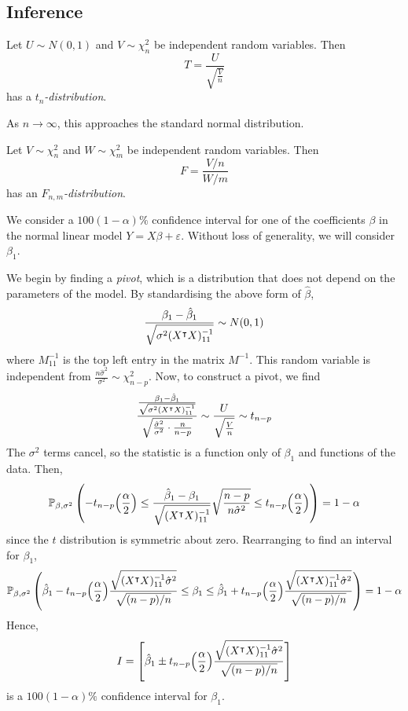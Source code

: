 \subsection{Inference}
\begin{definition}
	Let \( U \sim N(0,1) \) and \( V \sim \chi^2_n \) be independent random variables.
	Then
	\[
		T = \frac{U}{\sqrt{\frac{V}{n}}}
	\]
	has a \textit{\( t_n \)-distribution}.
\end{definition}
As \( n \to \infty \), this approaches the standard normal distribution.
\begin{definition}
	Let \( V \sim \chi^2_n \) and \( W \sim \chi^2_m \) be independent random variables.
	Then
	\[
		F = \frac{V/n}{W/m}
	\]
	has an \textit{\( F_{n,m} \)-distribution}.
\end{definition}
\begin{example}
	We consider a \( 100(1-\alpha)\% \) confidence interval for one of the coefficients \( \beta \) in the normal linear model \( Y = X\beta + \varepsilon \).
	Without loss of generality, we will consider \( \beta_1 \).

	We begin by finding a \textit{pivot}, which is a distribution that does not depend on the parameters of the model.
	By standardising the above form of \( \hat \beta \),
	\[
		\frac{\beta_1 - \hat \beta_1}{\sqrt{\sigma^2(X^\intercal X)^{-1}_{11}}} \sim N(0,1)
	\]
	where \( M^{-1}_{11} \) is the top left entry in the matrix \( M^{-1} \).
	This random variable is independent from \( \frac{n\hat \sigma^2}{\sigma^2} \sim \chi^2_{n-p} \).
	Now, to construct a pivot, we find
	\[
		\frac{\frac{\beta_1 - \hat \beta_1}{\sqrt{\sigma^2(X^\intercal X)^{-1}_{11}}}}{\sqrt{\frac{\hat \sigma^2}{\sigma^2} \cdot \frac{n}{n-p}}} \sim \frac{U}{\sqrt{\frac{V}{n}}} \sim t_{n-p}
	\]
	The \( \sigma^2 \) terms cancel, so the statistic is a function only of \( \beta_1 \) and functions of the data.
	Then,
	\[
		\mathbb{P}_{\beta,\sigma^2}\left({ -t_{n-p}\qty(\frac{\alpha}{2}) \leq \frac{\hat \beta_1 - \beta_1}{\sqrt{(X^\intercal X)^{-1}_{11}}} \sqrt{\frac{n-p}{n\hat\sigma^2}} \leq t_{n-p}\qty(\frac{\alpha}{2}) }\right) = 1-\alpha
	\]
	since the \( t \) distribution is symmetric about zero.
	Rearranging to find an interval for \( \beta_1 \),
	\[
		\mathbb{P}_{\beta,\sigma^2}\left({
			\hat \beta_1 - t_{n-p}\qty(\frac{\alpha}{2}) \frac{\sqrt{(X^\intercal X)^{-1}_{11} \hat\sigma^2}}{\sqrt{(n-p)/n}}
			\leq \beta_1 \leq
			\hat \beta_1 + t_{n-p}\qty(\frac{\alpha}{2}) \frac{\sqrt{(X^\intercal X)^{-1}_{11} \hat\sigma^2}}{\sqrt{(n-p)/n}}
		}\right) = 1-\alpha
	\]
	Hence,
	\[
		I = \qty[\hat \beta_1 \pm t_{n-p}\qty(\frac{\alpha}{2}) \frac{\sqrt{(X^\intercal X)^{-1}_{11} \hat \sigma^2}}{\sqrt{(n-p)/n}} ]
	\]
	is a \( 100(1-\alpha)\% \) confidence interval for \( \beta_1 \).


\end{example}
